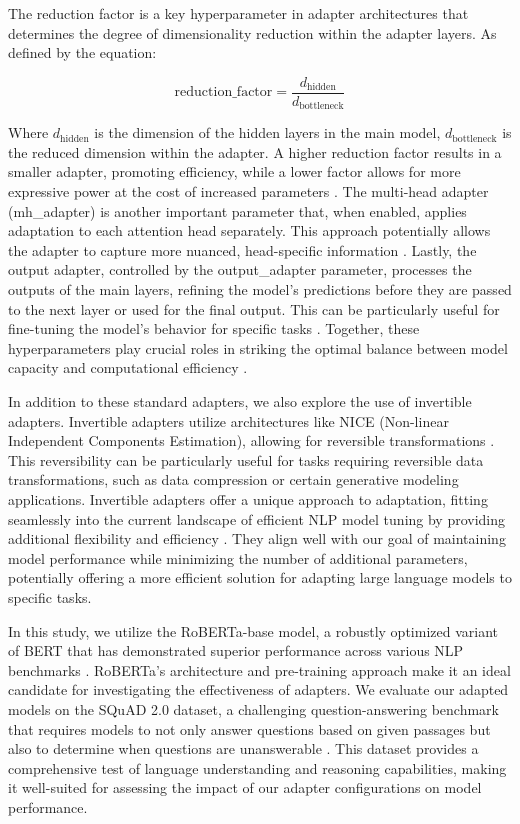 \documentclass[conference]{IEEEtran}
\begin{document}
The reduction factor is a key hyperparameter in adapter architectures that determines the degree of dimensionality reduction within the adapter layers. As defined by the equation:

\begin{equation}
    \text{reduction\_factor} = \frac{d_{\text{hidden}}}{d_{\text{bottleneck}}}
    \label{eq:placeholder}
\end{equation}

Where $d_{\text{hidden}}$ is the dimension of the hidden layers in the main model, $d_{\text{bottleneck}}$ is the reduced dimension within the adapter. A higher reduction factor results in a smaller adapter, promoting efficiency, while a lower factor allows for more expressive power at the cost of increased parameters \cite{b11}. The multi-head adapter (mh\_adapter) is another important parameter that, when enabled, applies adaptation to each attention head separately. This approach potentially allows the adapter to capture more nuanced, head-specific information \cite{b12}. Lastly, the output adapter, controlled by the output\_adapter parameter, processes the outputs of the main layers, refining the model's predictions before they are passed to the next layer or used for the final output. This can be particularly useful for fine-tuning the model's behavior for specific tasks \cite{b12}. Together, these hyperparameters play crucial roles in striking the optimal balance between model capacity and computational efficiency \cite{b8,b11}. 

In addition to these standard adapters, we also explore the use of invertible adapters. Invertible adapters utilize architectures like NICE (Non-linear Independent Components Estimation), allowing for reversible transformations \cite{b13}. This reversibility can be particularly useful for tasks requiring reversible data transformations, such as data compression or certain generative modeling applications. Invertible adapters offer a unique approach to adaptation, fitting seamlessly into the current landscape of efficient NLP model tuning by providing additional flexibility and efficiency \cite{b14}. They align well with our goal of maintaining model performance while minimizing the number of additional parameters, potentially offering a more efficient solution for adapting large language models to specific tasks.

In this study, we utilize the RoBERTa-base model, a robustly optimized variant of BERT that has demonstrated superior performance across various NLP benchmarks \cite{b4}. RoBERTa's architecture and pre-training approach make it an ideal candidate for investigating the effectiveness of adapters. We evaluate our adapted models on the SQuAD 2.0 dataset, a challenging question-answering benchmark that requires models to not only answer questions based on given passages but also to determine when questions are unanswerable \cite{b15}. This dataset provides a comprehensive test of language understanding and reasoning capabilities, making it well-suited for assessing the impact of our adapter configurations on model performance.
\end{document}

